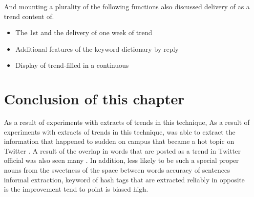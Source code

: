 And mounting a plurality of the following functions also discussed delivery of as a trend content of.

\begin{itemize}
    \item The 1st and the delivery of one week of trend
    \item Additional features of the keyword dictionary by reply
    \item Display of trend-filled in a continuous
\end{itemize}


\section{Conclusion of this chapter}
As a result of experiments with extracts of trends in this technique, As a result of experiments with extracts of trends in this technique, was able to extract the information that happened to sudden on campus that became a hot topic on Twitter .
A result of the overlap in words that are posted as a trend in Twitter official was also seen many . In addition, less likely to be such a special proper nouns from the sweetness of the space between words accuracy of sentences informal extraction, keyword of hash tags that are extracted reliably in opposite is the improvement tend to point is biased high.

